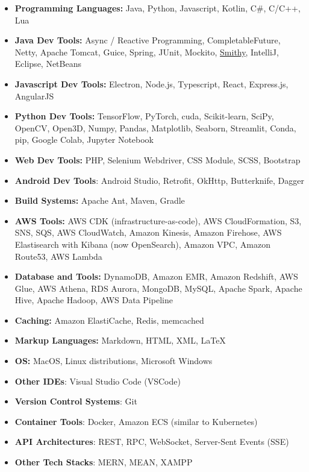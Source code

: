 \newcommand{\Smithy}{\href{https://smithy.io/}{Smithy}}
\begin{itemize}[label={}, leftmargin=0in]
   \setlength\itemsep{0em}
   \item \textbf{Programming Languages:} Java, Python, Javascript, Kotlin, C\#, C/C++, Lua
   \item \textbf{Java Dev Tools:} Async / Reactive Programming, CompletableFuture, Netty, Apache Tomcat, Guice, Spring, JUnit, Mockito, \Smithy, IntelliJ, Eclipse, NetBeans
   \item \textbf{Javascript Dev Tools:} Electron, Node.js, Typescript, React, Express.js, AngularJS
   \item \textbf{Python Dev Tools:} TensorFlow, PyTorch, cuda, Scikit-learn, SciPy, OpenCV, Open3D, Numpy, Pandas, Matplotlib, Seaborn, Streamlit, Conda, pip, Google Colab, Jupyter Notebook
   \item \textbf{Web Dev Tools:} PHP, Selenium Webdriver, CSS Module, SCSS, Bootstrap
   \item \textbf{Android Dev Tools}: Android Studio, Retrofit, OkHttp, Butterknife, Dagger
   \item \textbf{Build Systems:} Apache Ant, Maven, Gradle
   \item \textbf{AWS Tools:} AWS CDK (infrastructure-as-code), AWS CloudFormation, S3, SNS, SQS, AWS CloudWatch, Amazon Kinesis, Amazon Firehose, AWS Elastisearch with Kibana (now OpenSearch), Amazon VPC, Amazon Route53, AWS Lambda
   \item \textbf{Database and Tools:} DynamoDB, Amazon EMR, Amazon Redshift, AWS Glue, AWS Athena, RDS Aurora, MongoDB, MySQL, Apache Spark, Apache Hive, Apache Hadoop, AWS Data Pipeline
   \item \textbf{Caching:} Amazon ElastiCache, Redis, memcached
   \item \textbf{Markup Languages:} Markdown, HTML, XML, \LaTeX
   \item \textbf{OS:} MacOS, Linux distributions, Microsoft Windows
   \item \textbf{Other IDEs}: Visual Studio Code (VSCode)
   \item \textbf{Version Control Systems}: Git
   \item \textbf{Container Tools}: Docker, Amazon ECS (similar to Kubernetes)
   \item \textbf{API Architectures}: REST, RPC, WebSocket, Server-Sent Events (SSE)
   \item \textbf{Other Tech Stacks}: MERN, MEAN, XAMPP
\end{itemize}
